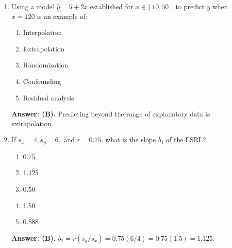 \begin{enumerate}[leftmargin=1.5em]
  \item Using a model $\hat{y} = 5 + 2x$ established for $x \in [10, 50]$ to predict $y$ when $x = 120$ is an example of:
  \begin{enumerate}[label=(\Alph*)]
    \item Interpolation \item Extrapolation \item Randomization \item Confounding \item Residual analysis
  \end{enumerate}
  \textbf{Answer: (B).} Predicting beyond the range of explanatory data is extrapolation.

  \item If $s_x = 4, s_y = 6,$ and $r = 0.75$, what is the slope $b_1$ of the LSRL?
  \begin{enumerate}[label=(\Alph*)]
    \item 0.75 \item 1.125 \item 0.50 \item 1.50 \item 0.888
  \end{enumerate}
  \textbf{Answer: (B).} $b_1 = r(s_y / s_x) = 0.75(6/4) = 0.75(1.5) = 1.125$.
\end{enumerate}

